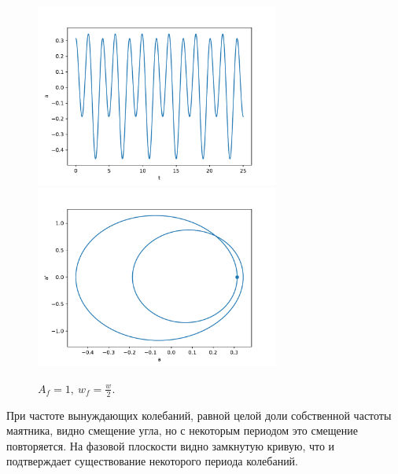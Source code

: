             \begin{figure}[H]
                \centering
                \includegraphics[width=8cm]{pictures/4resonance2.pdf}
                \includegraphics[width=8cm]{pictures/4resonance2p.pdf}
                \caption{$A_f = 1, ~ w_f = \frac{w}{2}$.}
            \end{figure}
            При частоте вынуждающих колебаний, равной целой доли собственной частоты маятника, видно смещение угла, но с некоторым периодом это смещение повторяется. На фазовой плоскости видно замкнутую кривую, что и подтверждает существование некоторого периода колебаний.

